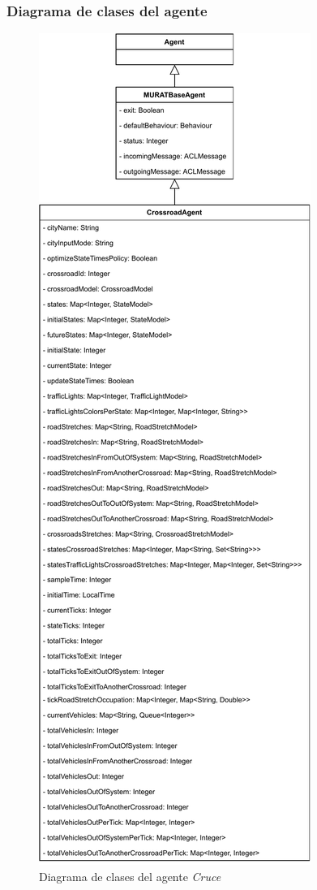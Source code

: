 \subsubsection{Diagrama de clases del agente}
\begin{figure}[H]
    \centering
    \includegraphics[width=0.50\linewidth]{text/image/DAgen-DC-Crossroad.pdf}
    \caption{Diagrama de clases del agente \textit{Cruce}}
    \label{fig:dc_agente_cruce}
\end{figure}

\newpage
